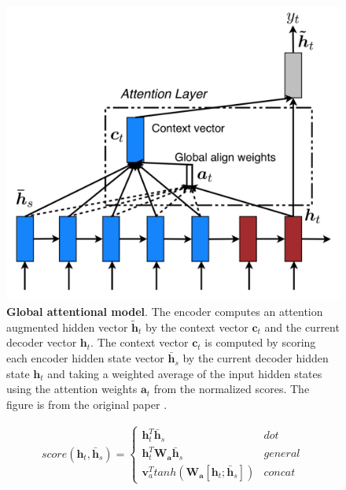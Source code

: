 \begin{figure}
\centering
\includegraphics[width=\linewidth]{figures/luong2015.png}
\vspace{-8mm}
\caption{\textbf{Global attentional model}. The encoder computes an attention augmented hidden vector $\bm{\tilde h}_t$ by the context vector $\bm{c}_t$ and the current decoder vector $\bm{h}_t$. The context vector $\bm{c}_t$ is computed by
scoring each encoder hidden state vector $\bm{\bar h}_s$ by the current decoder hidden state $\bm{h}_t$ and taking a weighted average of the input hidden states using the attention weights $\bm{a}_t$ from the normalized scores. The figure is from the original paper \cite{luong2015effective}.}
\label{fig: luong2015}
\end{figure}

\small
\begin{align}
    score(\bm{h}_t, \bm{\bar h}_s) =
  \begin{cases}
        \bm{h}_t^T \bm{\bar h}_s & dot \\
        \bm{h}_t^T \bm{W_a} \bm{\bar h}_s & general \\
        \bm{v}_a^T tanh(\bm{W_a} [\bm{h}_t;\bm{\bar h}_s]) & concat 
  \end{cases}
  \label{eq: score}
\end{align}
\normalsize

